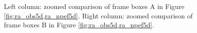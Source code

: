 {\begin{figure}[htb!]
   \centering
   \\
   \\
\caption{Left column: zoomed comparison of frame boxes A in Figure \ref{fig:ra_obs5d,ra_npef5d}. Right column: zoomed comparison of frame boxes B in Figure \ref{fig:ra_obs5d,ra_npef5d}.}
\label{fig:ra_obs5da,ra_npef5da,ra_obs5db,ra_npef5db}
\end{figure}
%
%
%
%
}

